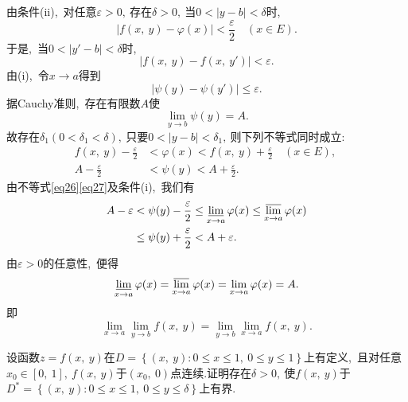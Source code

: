 	
	\begin{solution}
		由条件(ii),\ 对任意$\varepsilon>0,\ $存在$\delta>0,\ $当$0<|y-b|<\delta$时,\ 
		$$|f(x,\ y)-\varphi(x)|<\frac{\varepsilon}{2}\quad (x\in E).$$
		于是,\ 当$0<|y'-b|<\delta$时,\ 
		$$|f(x,\ y)-f(x,\ y')|<\varepsilon.$$
		由(i),\ 令$x\rightarrow a$得到
		$$|\psi(y)-\psi(y')|\le \varepsilon.$$
		据Cauchy准则,\ 存在有限数$A$使
		$$\lim\limits_{y\rightarrow b}\psi(y)=A.$$
		故存在$\delta_1(0<\delta_1<\delta),\ $只要$0<|y-b|<\delta_1,\ $则下列不等式同时成立:
		\begin{align}
			f(x,\ y)-\frac{\varepsilon}{2}&<\varphi(x)<f(x,\ y)+\frac{\varepsilon}{2}\quad(x\in E),\ \label{eq26}\\
			A-\frac{\varepsilon}{2}&<\psi(y)<A+\frac{\varepsilon}{2}.\label{eq27}
		\end{align}
		由不等式\eqref{eq26}\eqref{eq27}及条件(i),\ 我们有
		\begin{align*}
			A-\varepsilon&<\psi(y)-\frac{\varepsilon}{2}\le \varliminf\limits_{x\rightarrow a}\varphi(x)\le\varlimsup\limits_{x\rightarrow a}\varphi(x)\\
			&\le\psi(y)+\frac{\varepsilon}{2}<A+\varepsilon.
		\end{align*}
		由$\varepsilon>0$的任意性,\ 便得
		$$\varliminf\limits_{x\rightarrow a}\varphi(x)=\varlimsup\limits_{x\rightarrow a}\varphi(x)=\lim\limits_{x\rightarrow a}\varphi(x)=A.$$
		即
		$$\lim\limits_{x\rightarrow a}\lim\limits_{y\rightarrow b}f(x,\ y)=\lim\limits_{y\rightarrow b}\lim\limits_{x\rightarrow a}f(x,\ y).$$ 
	\end{solution}
	\newpage
	\begin{problem}
		设函数$z=f(x,\ y)$在$D=\left\{(x,\ y):0\le x\le 1,\ 0\le y\le 1\right\}$上有定义,\ 且对任意$x_0\in\left[0,\ 1\right],\ f(x,\ y)$于$\left(x_0,\ 0\right)$点连续.证明存在$\delta>0,\ $使$f(x,\ y)$于$D^*=\left\{(x,\ y):0\le x\le 1,\ 0\le y\le\delta\right\}$上有界.
	\end{problem}
	
